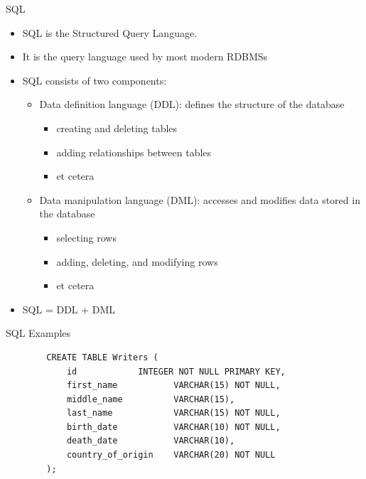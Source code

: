 \documentclass{beamer}
\begin{document}
\begin{frame}{SQL}
\begin{itemize}
  \item SQL is the \alert{Structured Query Language}.  \pause
  \item It is the query language used by most modern RDBMSs  \pause
  \item SQL consists of two components:  \pause
    \begin{itemize}
      \item \alert{Data definition language} (DDL): defines the structure of the database~\citep{silberschatz2010database,harrington2009relational} 
      \begin{itemize}  \pause
        \item creating and deleting tables
        \item adding relationships between tables
        \item et cetera
        \end{itemize}
      \item \alert{Data manipulation language} (DML): accesses and modifies data stored in the database~\citep{silberschatz2010database,harrington2009relational}  \pause
      \begin{itemize}
        \item selecting rows
        \item adding, deleting, and modifying rows
        \item et cetera
      \end{itemize} \pause
    \end{itemize} 
    \item SQL = DDL + DML
\end{itemize}
\end{frame}

\begin{frame}[fragile]{SQL Examples}
\begin{example}
    \begin{verbatim}
        CREATE TABLE Writers (
            id            INTEGER NOT NULL PRIMARY KEY,
            first_name           VARCHAR(15) NOT NULL,
            middle_name          VARCHAR(15),
            last_name            VARCHAR(15) NOT NULL,
            birth_date           VARCHAR(10) NOT NULL,
            death_date           VARCHAR(10),
            country_of_origin    VARCHAR(20) NOT NULL
        );
\end{verbatim}
  \end{example}
\end{frame}
\end{document}
